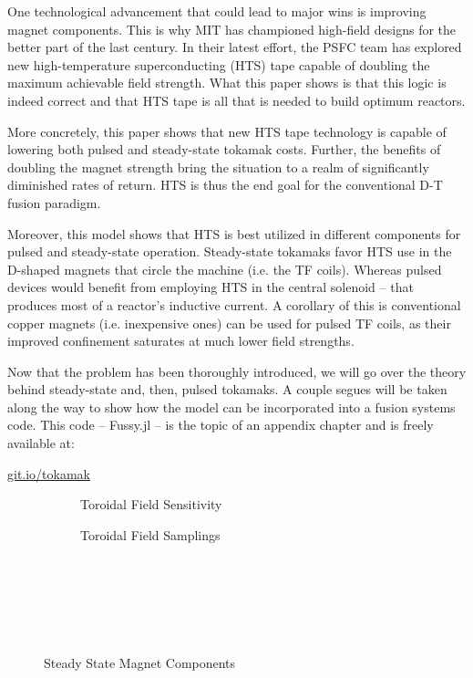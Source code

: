 One technological advancement that could lead to major wins is improving magnet components. This is why MIT has championed high-field designs for the better part of the last century. In their latest effort, the PSFC team has explored new high-temperature superconducting (HTS) tape capable of doubling the maximum achievable field strength. What this paper shows is that this logic is indeed correct and that HTS tape is all that is needed to build optimum reactors.

More concretely, this paper shows that new HTS tape technology is capable of lowering both pulsed and steady-state tokamak costs. Further, the benefits of doubling the magnet strength bring the situation to a realm of significantly diminished rates of return. HTS is thus the end goal for the conventional D-T fusion paradigm. 

Moreover, this model shows that HTS is best utilized in different components for pulsed and steady-state operation. Steady-state tokamaks favor HTS use in the D-shaped magnets that circle the machine (i.e. the TF coils). Whereas pulsed devices would benefit from employing HTS in the central solenoid -- that produces most of a reactor's inductive current. A corollary of this is conventional copper magnets (i.e. inexpensive ones) can be used for pulsed TF coils, as their improved confinement saturates at much lower field strengths.

Now that the problem has been thoroughly introduced, we will go over the theory behind steady-state and, then, pulsed tokamaks. A couple segues will be taken along the way to show how the model can be incorporated into a fusion systems code. This code -- Fussy.jl -- is the topic of an appendix chapter and is freely available at:
 
{\centering \href{http://git.io/tokamak}{git.io/tokamak} \par }

\clearpage

\newpage

\begin{figure}
    \centering
    \hfill 
    \begin{subfigure}[t]{0.42\textwidth}
        \centering
    \begin{adjustbox}{width=\textwidth}
      \Large
      
    \end{adjustbox}
        \caption{Toroidal Field Sensitivity}
    \end{subfigure}
    \hfill
    \begin{subfigure}[t]{0.48\textwidth}
        \centering
    \begin{adjustbox}{width=\textwidth}
      \Large
      
    \end{adjustbox}
        \caption{Toroidal Field Samplings}
    \end{subfigure}
    \hfill \hfill ~\\ ~\\ ~\\
    \caption{Steady State Magnet Components} ~\\
    \label{fig:charybdis}
\end{figure}

